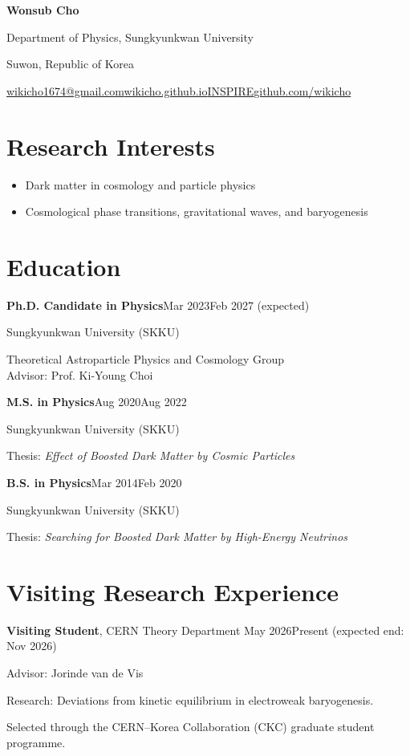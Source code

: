 \documentclass[11pt,a4paper]{article}
\newcommand{\education}[4]{%
    \textbf{#1}\hfill{\small\color{muted}#2}\par
    #3\par
    {\small\color{muted}#4}\par\vspace{6pt}
}
\begin{document}
\fontsize{10.5}{13}\selectfont
\color{bodycolor}
\thispagestyle{firstpage}

{\fontsize{27}{31}\selectfont\bfseries Wonsub Cho}\par
\vspace{5pt}
{\color{accent}Department of Physics, Sungkyunkwan University}\par
\vspace{3pt}
{\small\color{muted}Suwon, Republic of Korea}\par
\vspace{6pt}
{\small\href{mailto:wikicho1674@gmail.com}{wikicho1674@gmail.com}\enspace\textcolor{muted}{\textperiodcentered}\enspace\href{https://wikicho.github.io}{wikicho.github.io}\enspace\textcolor{muted}{\textperiodcentered}\enspace\href{https://inspirehep.net/authors/1821880}{INSPIRE}\enspace\textcolor{muted}{\textperiodcentered}\enspace\href{https://github.com/wikicho}{github.com/wikicho}}\par
\vspace{2pt}

\section*{Research Interests}
\begin{itemize}[leftmargin=5mm,labelsep=2mm,itemsep=3pt,topsep=0pt,parsep=0pt]
\item Dark matter in cosmology and particle physics
\item Cosmological phase transitions, gravitational waves, and baryogenesis
\end{itemize}

\section*{Education}
\education{Ph.D. Candidate in Physics}{Mar 2023\textendash Feb 2027 (expected)}{Sungkyunkwan University (SKKU)}{Theoretical Astroparticle Physics and Cosmology Group\\Advisor: Prof. Ki-Young Choi}
\education{M.S. in Physics}{Aug 2020\textendash Aug 2022}{Sungkyunkwan University (SKKU)}{Thesis: \textit{Effect of Boosted Dark Matter by Cosmic Particles}}
\education{B.S. in Physics}{Mar 2014\textendash Feb 2020}{Sungkyunkwan University (SKKU)}{Thesis: \textit{Searching for Boosted Dark Matter by High-Energy Neutrinos}}

\section*{Visiting Research Experience}
\textbf{Visiting Student}, CERN Theory Department \hfill{\small\color{muted}May 2026\textendash Present (expected end: Nov 2026)}\par
Advisor: Jorinde van de Vis\par
Research: Deviations from kinetic equilibrium in electroweak baryogenesis.\par
{\small\color{muted}Selected through the CERN--Korea Collaboration (CKC) graduate student programme.}\par
\end{document}
